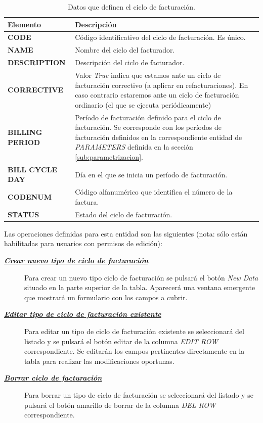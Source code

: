 \begin{table}[H]
  \centering
  \setlength{\leftmargini}{0.4cm}
  \resizebox{14cm}{!} {
  \begin{tabular}{|m{3.5cm} m{11cm}|}
  \rowcolor{udcpink!25}
  \hline
  	\textbf{Elemento} & \textbf{Descripción} \\\hline
	\textbf{CODE} & Código identificativo del ciclo de facturación. Es único.   \\
	\textbf{NAME} & Nombre del ciclo del facturador. \\
	\textbf{DESCRIPTION} & Descripción del ciclo de facturador. \\
	\textbf{CORRECTIVE} & Valor \emph{True} indica que estamos ante un ciclo de facturación correctivo (a aplicar en refacturaciones). En caso contrario estaremos ante un ciclo de facturación ordinario (el que se ejecuta periódicamente)\\
	\textbf{BILLING PERIOD} & Período de facturación definido para el ciclo de facturación. Se corresponde con los períodos de facturación definidos en la correspondiente entidad de \emph{PARAMETERS} definida en la sección \ref{sub:parametrizacion}.   \\
	\textbf{BILL CYCLE DAY} & Día en el que se inicia un período de facturación. \\
	\textbf{CODENUM} & Código alfanumérico que identifica el número de la factura.\\
	\textbf{STATUS} & Estado del ciclo de facturación.
	\\\hline
  \end{tabular}
  } %
  \caption{Datos que definen el ciclo de facturación.}
  \label{tab:ciclo-facturacion}
\end{table}


Las operaciones definidas para esta entidad son las siguientes (nota: sólo están habilitadas para usuarios con permisos de edición):
\begin{description}
  \item[\underline{\textsl{\textbf{Crear nuevo tipo de ciclo de facturación}}}] Para crear un nuevo tipo ciclo de facturación se pulsará el botón \textit{New Data} situado en la parte superior de la tabla. Aparecerá una ventana emergente que mostrará un formulario con los campos a cubrir.

  \item[\underline{\textsl{\textbf{Editar tipo de ciclo de facturación existente}}}] Para editar un tipo de ciclo de facturación existente se seleccionará del listado y se pulsará el botón editar de la columna \textit{EDIT ROW} correspondiente. Se editarán los campos pertinentes directamente en la tabla para realizar las modificaciones oportunas. 

  \item[\underline{\textsl{\textbf{Borrar ciclo de facturación}}}] Para borrar un tipo de ciclo de facturación se seleccionará del listado y se pulsará el botón amarillo de borrar de la columna \textit{DEL ROW} correspondiente.
\end{description}

